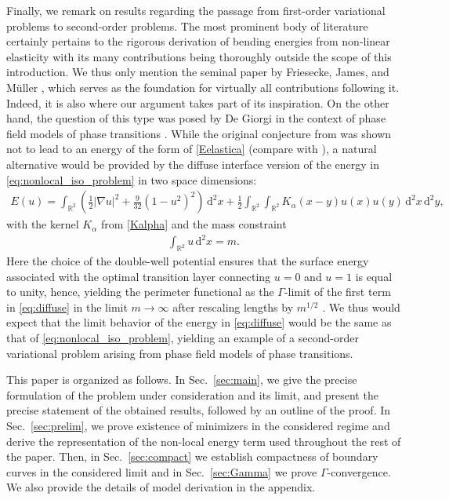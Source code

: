\documentclass[11pt]{article}
\newcounter{statement}
\numberwithin{statement}{section}
\numberwithin{equation}{section}
\theoremstyle{remark}
\newcommand{\R}{\mathbb R} 				%
\newcommand{\intd}{\, \mathrm{d}} 				%
\begin{document}
Finally, we remark on results regarding the passage from first-order
variational problems to second-order problems.  The most prominent
body of literature certainly pertains to the rigorous derivation of
bending energies from non-linear elasticity with its many
contributions being thoroughly outside the scope of this introduction.
We thus only mention the seminal paper by Friesecke, James, and
M{\"u}ller \cite{friesecke2002theorem}, which serves as the foundation
for virtually all contributions following it.  Indeed, it is also
where our argument takes part of its inspiration. On the other
  hand, the question of this type was posed by De Giorgi in the
  context of phase field models of phase transitions
  \cite{degiorgi91}. While the original conjecture from
  \cite{degiorgi91} was shown not to lead to an energy of the form of
  \eqref{Eelastica} \cite{bellettini23} (compare with \cite{roger06}),
  a natural alternative would be provided by the diffuse interface
  version of the energy in \eqref{eq:nonlocal_iso_problem} in two
  space dimensions:
  \begin{align}
    \label{eq:diffuse}
    E(u) = \int_{\R^2} \left( \frac12 |\nabla u|^2 + \frac{9}{32} (1 -
    u^2)^2 \right) \intd^2 x + \frac12 \int_{\R^2} \int_{\R^2}
    K_\alpha(x - y) u(x) u(y) \intd^2 x  \intd^2 y,
  \end{align}
  with the kernel $K_\alpha$ from \eqref{Kalpha} and the mass
  constraint
  \begin{align}
    \int_{\R^2} u \intd^2 x = m.
  \end{align}
  Here the choice of the double-well potential ensures that the
  surface energy associated with the optimal transition layer
  connecting $u = 0$ and $u = 1$ is equal to unity, hence, yielding
  the perimeter functional as the $\Gamma$-limit of the first term in
  \eqref{eq:diffuse} in the limit $m \to \infty$ after rescaling
  lengths by $m^{1/2}$ \cite{modica87}. We thus would expect that the
  limit behavior of the energy in \eqref{eq:diffuse} would be the same
  as that of \eqref{eq:nonlocal_iso_problem}, yielding an example of a
  second-order variational problem arising from phase field models of
  phase transitions.

  This paper is organized as follows. In Sec.\ \ref{sec:main}, we give
  the precise formulation of the problem under consideration and its
  limit, and present the precise statement of the obtained results,
  followed by an outline of the proof. In Sec.\ \ref{sec:prelim}, we
  prove existence of minimizers in the considered regime and derive
  the representation of the non-local energy term used throughout the
  rest of the paper. Then, in Sec.\ \ref{sec:compact} we establish
  compactness of boundary curves in the considered limit and in Sec.\
  \ref{sec:Gamma} we prove $\Gamma$-convergence.  We also provide the
  details of model derivation in the appendix.
\end{document}
